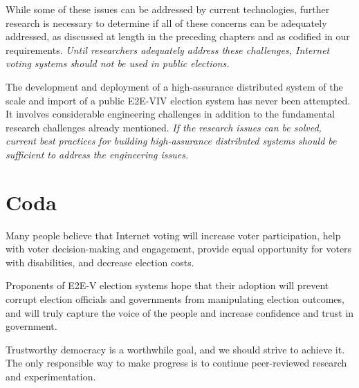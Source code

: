 While some of these issues can be addressed by current technologies,
further research is necessary to determine if all of these concerns
can be adequately addressed, as discussed at length in the preceding
chapters and as codified in our requirements. \emph{Until researchers
  adequately address these challenges, Internet voting systems should
  not be used in public elections.}


The development and deployment of a high-assurance distributed system
of the scale and import of a public E2E-VIV election system has never
been attempted. It involves considerable engineering challenges in
addition to the fundamental research challenges already
mentioned. \emph{If the research issues can be solved, current best
practices for building high-assurance distributed systems should be
sufficient to address the engineering issues.}

\section*{Coda}

Many people believe that Internet voting will increase voter
participation, help with voter decision-making and engagement, provide
equal opportunity for voters with disabilities, and decrease election
costs.

Proponents of E2E-V election systems hope that their adoption will
prevent corrupt election officials and governments from manipulating
election outcomes, and will truly capture the voice of the people and
increase confidence and trust in government.

Trustworthy democracy is a worthwhile goal, and we should strive to
achieve it. The only responsible way to make progress is to continue
peer-reviewed research and experimentation.
